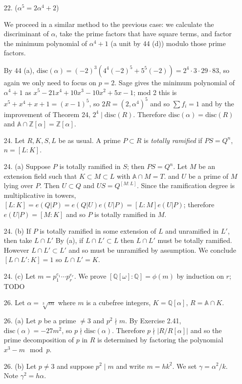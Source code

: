 \documentclass{article}
\newcommand{\w}[0]{\omega}
\newcommand{\Q}[0]{\mathbb{Q}}
\newcommand{\Z}[0]{\mathbb{Z}}
\newcommand{\disc}[1]{\text{disc}(#1)}
\newcommand{\ringofintegers}[1]{\mathbb{A} \cap #1}
\begin{document}
\begin{enumerate}
\item[22. ($\alpha^5 = 2\alpha^4 + 2$)]

We proceed in a similar method to the previous case: we calculate the discriminant of $\alpha$, take the prime factors that have square terms, and factor the minimum polynomial of $\alpha^4 + 1$ (a unit by 44 (d)) modulo those prime factors.

By 44 (a), $\disc{\alpha} = (-2)^3 (4^4 (-2)^5 + 5^5 (-2)) = 2^4 \cdot 3 \cdot 29 \cdot 83$, so again we only need to focus on $p = 2$.  Sage gives the minimum polynomial of $\alpha^4 + 1$ as $x^5 - 21x^4 + 10x^3 - 10x^2 + 5x - 1$; mod 2 this is $x^5 + x^4 + x + 1 = (x - 1)^5$, so $2R = (2, \alpha^4)^5$ and so $\sum f_i = 1$ and by the improvement of Theorem 24, $2^4 \mid \disc{R}$.  Therefore $\disc{\alpha} = \disc{R}$ and $\ringofintegers{\Z[\alpha]} = \Z[\alpha]$.

\item[24.] Let $R, K, S, L$ be as usual.  A prime $P \subset R$ is {\it totally ramified} if $PS = Q^{n}$, $n = [L : K]$.

\item[24. (a)] Suppose $P$ is totally ramified in $S$; then $PS = Q^{n}$.  Let $M$ be an extension field such that $K \subset M \subset L$ with $\ringofintegers{M} = T$. and $U$ be a prime of $M$ lying over $P$.  Then $U \subset Q$ and $US = Q^{[M : L]}$.  Since the ramification degree is multiplicative in towers, $[L : K] = e(Q|P) = e(Q|U)e(U|P) = [L:M]e(U|P)$; therefore $e(U|P) = [M:K]$ and so $P$ is totally ramified in $M$.

\item[24. (b)] If $P$ is totally ramified in some extension of $L$ and unramified in $L'$, then take $L \cap L'$  By (a), if $L \cap L' \subset L$ then $L \cap L'$ must be totally ramified.  However $L \cap L' \subset L'$ and so must be unramified by assumption.  We conclude $[L \cap L' : K] = 1$ so $L \cap L' = K$.

\item[24. (c)] Let $m = p_1^{e_1} \cdots p_r^{e_r}$.  We prove $[\Q[\w] : \Q] = \phi(m)$ by induction on $r$; TODO

\item[26.]  Let $\alpha = \sqrt[3]{m}$ where $m$ is a cubefree integers, $K = \Q[\alpha]$, $R = \ringofintegers{K}$.
\item[26. (a)] Let $p$ be a prime $\neq 3$ and $p^2 \nmid m$.  By Exercise 2.41, $\disc{\alpha} = -27m^2$, so $p \nmid \disc{\alpha}$.  Therefore $p \nmid |R / R[\alpha]|$ and so the prime decomposition of $p$ in $R$ is determined by factoring the polynomial $x^3 - m \mod p$.
\item[26. (b)] Let $p \neq 3$ and suppose $p^2 \mid m$ and write $m = hk^2$.  We set $\gamma = \alpha^2 / k$.  Note $\gamma^2 = h\alpha$.


\end{enumerate}
\end{document}
